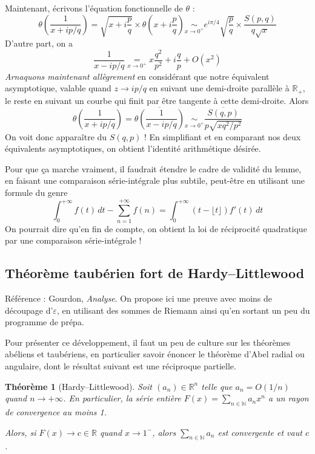 \documentclass[a4paper, 11pt]{article}
\def\N{\mathbb{N}}
\def\R{\mathbb{R}}
\newtheorem*{theorem}{Théorème}
\begin{document}
Maintenant, écrivons l'équation fonctionnelle de $\theta$ :
  \[ \theta\left( \frac{1}{x + ip/q} \right) =
    \sqrt{x + i\frac{p}{q}} \times \theta\left( x + i\frac{p}{q} \right)
    \underset{x \to 0^+}{\sim} e^{i\pi/4} \sqrt{\frac{p}{q}}
    \times \frac{S(p,q)}{q\sqrt{x}}
  \]
D'autre part, on a
  \[ \frac{1}{x - ip/q} \underset{x \to 0^+}{=}
    x\frac{q^2}{p^2} + i \frac{q}{p} + O(x^2)  \]
\emph{Arnaquons maintenant allègrement} en considérant que notre équivalent
asymptotique, valable quand $z \to ip/q$ en suivant une demi-droite parallèle à
$\R_+$, le reste en suivant un courbe qui finit par être tangente à cette
demi-droite. Alors
\[ \theta\left( \frac{1}{x + ip/q} \right)
  = \overline{\theta\left( \frac{1}{x - ip/q} \right)}
    \underset{x \to 0^+}{\sim} \frac{\overline{S(q,p)}}{p\sqrt{xq^2/p^2}}
  \]
  On voit donc apparaître du $S(q,p)$ ! En simplifiant et en comparant nos deux
  équivalents asymptotiques, on obtient l'identité arithmétique désirée.

Pour que ça marche vraiment, il faudrait étendre le cadre de validité du lemme,
en faisant une comparaison série-intégrale plus subtile, peut-être en utilisant
une formule du genre
  \[ \int_0^{+\infty} f(t)\,dt - \sum_{n=1}^{+\infty} f(n) =
    \int_0^{+\infty} (t - \lfloor t \rfloor)f'(t)\,dt
  \]
  On pourrait dire qu'en fin de compte, on obtient la loi de réciprocité
  quadratique par une comparaison série-intégrale !


\newpage

\subsection{Théorème taubérien fort de Hardy--Littlewood}
\label{tauber}

Référence : Gourdon, \emph{Analyse}. On propose ici une preuve avec moins de
découpage d'$\varepsilon$, en utilisant des sommes de Riemann ainsi qu'en
sortant un peu du programme de prépa.

Pour présenter ce développement, il faut un peu de culture sur les théorèmes
abéliens et taubériens, en particulier savoir énoncer le théorème d'Abel radial
ou angulaire, dont le résultat suivant est une réciproque partielle.

\begin{theorem}[Hardy--Littlewood]
  Soit $(a_n) \in \R^n$ telle que $a_n = O(1/n)$ quand $n \to +\infty$. En
  particulier, la série entière $F(x) = \sum_{n \in \N} a_n x^n$ a un rayon de
  convergence au moins 1.

  Alors, si $F(x) \to c \in \R$ quand $x \to 1^-$, alors $\sum_{n \in \N} a_n$
  est convergente et vaut $c$.
\end{theorem}
\end{document}
